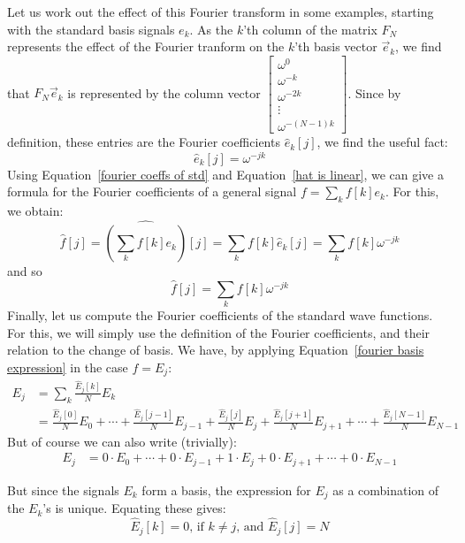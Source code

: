 \documentclass[12pt]{report}
\theoremstyle{plain}
\begin{document}
\medskip
Let us work out the effect of this Fourier transform in some examples, starting with the standard basis signals $e_k$.
As the $k$'th column of the matrix $F_N$ represents the effect of the Fourier tranform on the $k$'th basis vector $\vec e_k$, we find that $F_N \vec e_k$ is represented by the column vector $\begin{bmatrix} \omega^{0} \\ \omega^{-k} \\ \omega^{-2k} \\ \vdots \\ \omega^{-(N-1)k} \end{bmatrix}$. Since by definition, these entries are the Fourier coefficients $\hat e_k[j]$, we find the useful fact:
\begin{equation} \label{fourier coeffs of std}
\boxed{\hat e_k[j] = \omega^{-jk}}
\end{equation}
Using Equation~\ref{fourier coeffs of std} and Equation~\ref{hat is linear}, we can give a formula for the Fourier coefficients of a general signal $f = \sum_k f[k] e_k$. For this, we obtain:
\begin{equation*}
\hat f[j] = \widehat{\left(\sum_k f[k] e_k\right)}[j] = \sum_k f[k] \hat e_k[j] = \sum_k f[k] \omega^{-jk}
\end{equation*}
and so
\begin{equation} \label{fourier coeffs formula}
\boxed{\hat f[j] = \sum_k f[k] \omega^{-jk}}
\end{equation}
Finally, let us compute the Fourier coefficients of the standard wave functions. For this, we will simply use the definition of the Fourier coefficients, and their relation to the change of basis. We have, by applying Equation~\ref{fourier basis expression} in the case $f = E_j$:
\begin{align*}
E_j &= \sum_k \frac{\hat E_j[k]}{N} E_k \\
&= \frac{\hat E_j[0]}{N} E_0 + \cdots +
\frac{\hat E_j[j-1]}{N} E_{j-1} + \frac{\hat E_j[j]}{N} E_{j} + \frac{\hat E_j[j+1]}{N} E_{j+1} + \cdots + \frac{\hat E_j[N-1]}{N} E_{N-1}
\end{align*}
But of course we can also write (trivially):
\begin{align*}
E_j &= 0 \cdot E_0 + \cdots +
0 \cdot E_{j-1} + 1 \cdot E_{j} + 0 \cdot E_{j+1} + \cdots + 0 \cdot E_{N-1}
\end{align*}

But since the signals $E_k$ form a basis, the expression for $E_j$ as a combination of the $E_k$'s is unique. Equating these gives:
\begin{equation} \label{fourier coeffs of waveforms}
\boxed{\hat E_j[k] = 0 \text{, if $k \neq j$, and } \hat E_j[j] = N}
\end{equation}
\end{document}
